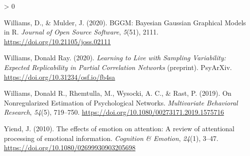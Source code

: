 \documentclass[
  english,
  man]{apa6}
\newlength{\cslhangindent}
\newenvironment{CSLReferences}[2] %
 {%
  \setlength{\parindent}{0pt}
  \ifodd #1 \everypar{\setlength{\hangindent}{\cslhangindent}}\ignorespaces\fi
  \ifnum #2 > 0
  \setlength{\parskip}{#2\baselineskip}
  \fi
 }%
 {}
\begin{document}
\begin{CSLReferences}{1}{0}
\leavevmode\hypertarget{ref-williams_bggm_2020}{}%
Williams, D., \& Mulder, J. (2020). {BGGM}: {Bayesian} {Gaussian} {Graphical} {Models} in {R}. \emph{Journal of Open Source Software}, \emph{5}(51), 2111. \url{https://doi.org/10.21105/joss.02111}

\leavevmode\hypertarget{ref-williams_learning_2020}{}%
Williams, Donald Ray. (2020). \emph{Learning to {Live} with {Sampling} {Variability}: {Expected} {Replicability} in {Partial} {Correlation} {Networks}} (preprint). PsyArXiv. \url{https://doi.org/10.31234/osf.io/fb4sa}

\leavevmode\hypertarget{ref-williams_nonregularized_2019}{}%
Williams, Donald R., Rhemtulla, M., Wysocki, A. C., \& Rast, P. (2019). On {Nonregularized} {Estimation} of {Psychological} {Networks}. \emph{Multivariate Behavioral Research}, \emph{54}(5), 719--750. \url{https://doi.org/10.1080/00273171.2019.1575716}

\leavevmode\hypertarget{ref-Yiend2010}{}%
Yiend, J. (2010). The effects of emotion on attention: {A} review of attentional processing of emotional information. \emph{Cognition \& Emotion}, \emph{24}(1), 3--47. \url{https://doi.org/10.1080/02699930903205698}

\end{CSLReferences}

\endgroup


\clearpage
\renewcommand{\listfigurename}{Figure captions}
\end{document}
